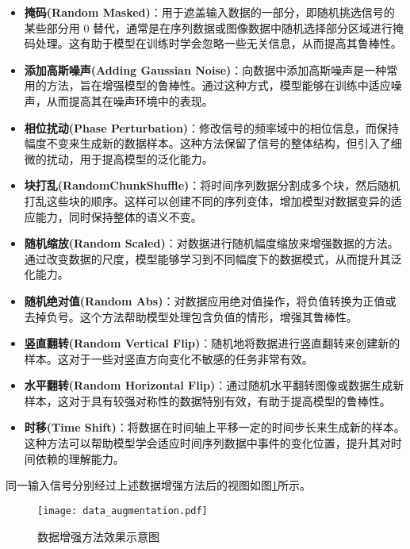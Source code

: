 \documentclass[master]{thesis-uestc}
\begin{document}
\begin{itemize}
    \item \textbf{掩码(Random Masked)}：用于遮盖输入数据的一部分，即随机挑选信号的某些部分用 0 替代，通常是在序列数据或图像数据中随机选择部分区域进行掩码处理。这有助于模型在训练时学会忽略一些无关信息，从而提高其鲁棒性。

    \item \textbf{添加高斯噪声(Adding Gaussian Noise)}：向数据中添加高斯噪声是一种常用的方法，旨在增强模型的鲁棒性。通过这种方式，模型能够在训练中适应噪声，从而提高其在噪声环境中的表现。

    \item \textbf{相位扰动(Phase Perturbation)}：修改信号的频率域中的相位信息，而保持幅度不变来生成新的数据样本。这种方法保留了信号的整体结构，但引入了细微的扰动，用于提高模型的泛化能力。

    \item \textbf{块打乱(RandomChunkShuffle)}：将时间序列数据分割成多个块，然后随机打乱这些块的顺序。这样可以创建不同的序列变体，增加模型对数据变异的适应能力，同时保持整体的语义不变。

    \item \textbf{随机缩放(Random Scaled)}：对数据进行随机幅度缩放来增强数据的方法。通过改变数据的尺度，模型能够学习到不同幅度下的数据模式，从而提升其泛化能力。

    \item \textbf{随机绝对值(Random Abs)}：对数据应用绝对值操作，将负值转换为正值或去掉负号。这个方法帮助模型处理包含负值的情形，增强其鲁棒性。

    \item \textbf{竖直翻转(Random Vertical Flip)}：随机地将数据进行竖直翻转来创建新的样本。这对于一些对竖直方向变化不敏感的任务非常有效。

    \item \textbf{水平翻转(Random Horizontal Flip)}：通过随机水平翻转图像或数据生成新样本，这对于具有较强对称性的数据特别有效，有助于提高模型的鲁棒性。

    \item \textbf{时移(Time Shift)}：将数据在时间轴上平移一定的时间步长来生成新的样本。这种方法可以帮助模型学会适应时间序列数据中事件的变化位置，提升其对时间依赖的理解能力。
\end{itemize}
同一输入信号分别经过上述数据增强方法后的视图如图\ref{data_augmentation}所示。
\begin{figure}[h]
    \centering
    \texttt{[image: data\_augmentation.pdf]}
    \caption{数据增强方法效果示意图}
    \label{data_augmentation}
\end{figure}
\end{document}
